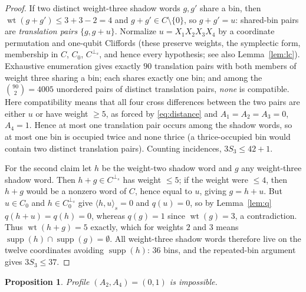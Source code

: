 \documentclass[11pt]{amsart}
\newtheorem{proposition}[theorem]{Proposition}
\theoremstyle{definition}
\theoremstyle{remark}
\DeclareMathOperator{\wt}{wt}
\DeclareMathOperator{\supp}{supp}
\newcommand{\perps}{{\perp_s}}
\newcommand{\sform}[2]{\langle #1,#2\rangle_s}
\begin{document}
\begin{proof}
If two distinct weight-three shadow words $g,g'$ share a bin, then
$\wt(g+g')\le 3+3-2=4$ and $g+g'\in C\setminus\{0\}$, so $g+g'=u$: shared-bin
pairs are \emph{translation pairs} $\{g,g+u\}$.  Normalize
$u=X_1X_2X_3X_4$ by a coordinate permutation and one-qubit Cliffords
(these preserve weights, the symplectic form, membership in $C$, $C_0$,
$C^{\perps}$, and hence every hypothesis; see also
Lemma~\ref{lem:lc}).  Exhaustive enumeration gives exactly $90$
translation pairs with both members of weight three
sharing a bin; each shares exactly one bin; and among the
$\binom{90}{2}=4005$ unordered pairs of distinct translation pairs,
\emph{none} is compatible.  Here compatibility means that all four cross
differences between the two pairs are either $u$ or have weight $\ge5$,
as forced by \eqref{eq:distance} and
$A_1=A_2=A_3=0$, $A_4=1$.  Hence at most one translation pair occurs among
the shadow words, so at most one bin is occupied twice and none thrice
(a thrice-occupied bin would contain two distinct translation pairs).
Counting incidences, $3S_3\le 42+1$.

For the second claim let $h$ be the weight-two shadow word and $g$ any
weight-three shadow word.  Then $h+g\in C^{\perps}$ has weight $\le5$; if
the weight were $\le4$, then $h+g$ would be a nonzero word of $C$, hence
equal to $u$, giving $g=h+u$.  But $u\in C_0$ and $h\in C_0^{\perps}$
give $\sform{h}{u}=0$ and $q(u)=0$, so by Lemma~\ref{lem:q}
$q(h+u)=q(h)=0$, whereas $q(g)=1$ since $\wt(g)=3$, a contradiction.  Thus
$\wt(h+g)=5$ exactly, which for weights $2$ and $3$ means
$\supp(h)\cap\supp(g)=\emptyset$.  All weight-three shadow words therefore live on
the twelve coordinates avoiding $\supp(h)$: $36$ bins, and the repeated-bin
argument gives $3S_3\le37$.
\end{proof}

\begin{proposition}\label{prop:p01}
Profile $(A_2,A_4)=(0,1)$ is impossible.
\end{proposition}
\end{document}
